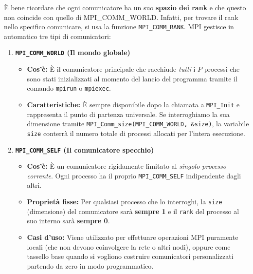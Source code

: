 È bene ricordare che ogni comunicatore ha un suo \textbf{spazio dei rank} e che questo non coincide con quello di MPI\_COMM\_WORLD. Infatti, per trovare il rank nello specifico comunicare, si usa la funzione \texttt{MPI\_COMM\_RANK}.
MPI gestisce in automatico tre tipi di comunicatori:
\begin{enumerate}
    \item \textbf{\texttt{MPI\_COMM\_WORLD} (Il mondo globale)}
    \begin{itemize}
        \item \textbf{Cos'è:} È il comunicatore principale che racchiude \emph{tutti} i $P$ processi che sono stati inizializzati al momento del lancio del programma tramite il comando \texttt{mpirun} o \texttt{mpiexec}.
        \item \textbf{Caratteristiche:} È sempre disponibile dopo la chiamata a \texttt{MPI\_Init} e rappresenta il punto di partenza universale. Se interroghiamo la sua dimensione tramite \texttt{MPI\_Comm\_size(MPI\_COMM\_WORLD, \&size)}, la variabile \texttt{size} conterrà il numero totale di processi allocati per l'intera esecuzione.
    \end{itemize}

    \item \textbf{\texttt{MPI\_COMM\_SELF} (Il comunicatore specchio)}
    \begin{itemize}
        \item \textbf{Cos'è:} È un comunicatore rigidamente limitato al \emph{singolo processo corrente}. Ogni processo ha il proprio \texttt{MPI\_COMM\_SELF} indipendente dagli altri.
        \item \textbf{Proprietà fisse:} Per qualsiasi processo che lo interroghi, la \texttt{size} (dimensione) del comunicatore sarà \textbf{sempre 1} e il \texttt{rank} del processo al suo interno sarà \textbf{sempre 0}.
        \item \textbf{Casi d'uso:} Viene utilizzato per effettuare operazioni MPI puramente locali (che non devono coinvolgere la rete o altri nodi), oppure come tassello base quando si vogliono costruire comunicatori personalizzati partendo da zero in modo programmatico.
    \end{itemize}


\end{enumerate}
